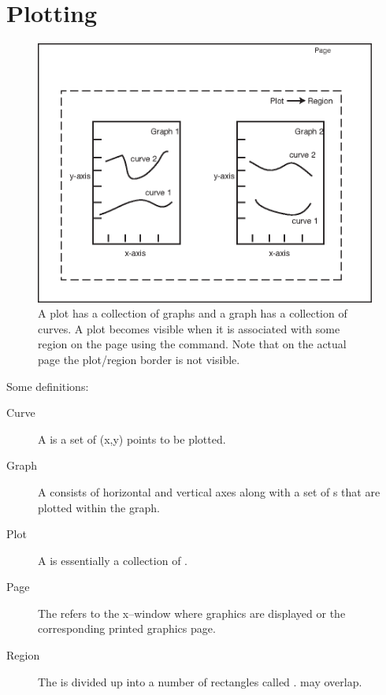 \section{Plotting}
\label{s:plotting}

\begin{figure}
  \centering
  \includegraphics{plot.eps}
  \caption[A plot has a collection of graphs.]
{A plot has a collection of graphs and a graph has a 
collection of curves. A plot becomes visible when it is associated
with some region on the page using the  command. Note that
on the actual page the plot/region border is not visible.}
  \label{f:plot}
\end{figure}

Some definitions:
  \vspace*{-3ex}
\begin{description}
\item[Curve] \Newline
A  is a set of (x,y) points to be plotted.
\item[Graph] \Newline
A  consists of horizontal and vertical axes along with a set
of s that are plotted within the graph. 
\item[Plot] \Newline
A  is essentially a collection of .
\item[Page] \Newline
The  refers to the x--window where graphics are displayed or the 
corresponding printed graphics page.
\item[Region] \Newline
The  is divided up into a number of rectangles called
.  may overlap.
\end{description}

